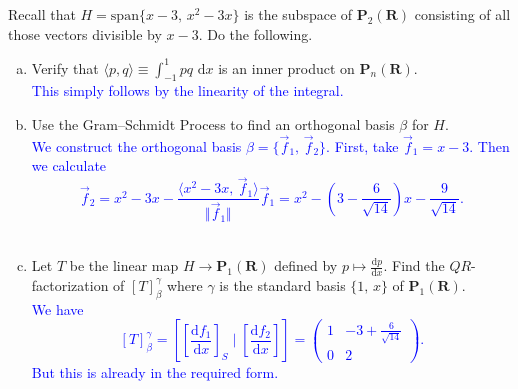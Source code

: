\documentclass[a4paper,11pt]{article}
\newcommand{\R}{\mathbf{R}}
\newcommand{\PP}{\mathbf{P}}
\newcommand{\blue}[1]{\textcolor{blue}{#1}}
\begin{document}
 Recall that
$H=\text{span}\{x-3,\,x^2-3x\}$ is the subspace of $\PP_2(\R)$
consisting of all those vectors divisible by $x-3$. Do the following.
\begin{enumerate}[(a)]
\item Verify that $\langle p,q \rangle \equiv \int_{-1}^1pq\text{ d}x$ is an
  inner product on $\PP_n(\R)$. \\

  \blue{This simply follows by the linearity of the integral. \\}

\item Use the Gram--Schmidt Process to find an orthogonal basis $\beta$ for $H$.
  \\

  \blue{We construct the orthogonal basis $\beta=\{\vec f_1,\,\vec f_2\}$.
    First, take $\vec f_1=x-3$. Then we calculate
    \[
      \vec f_2 = x^2-3x - \frac{\langle x^2-3x,\,\vec f_1 \rangle}{\Vert \vec f_1 \Vert}\vec f_1 = x^2-\left( 3-\frac{6}{\sqrt{14}} \right)x-\frac{9}{\sqrt{14}}.
    \] \\
  }

\item Let $T$ be the linear map $H \rightarrow \PP_1(\R)$ defined by $p
  \mapsto \frac{\text{d}p}{\text{d}x}$. Find the $QR$-factorization of
  $[T]_{\beta}^\gamma$ where $\gamma$ is the standard basis $\{1,\,x\}$ of
  $\PP_1(\R)$. \\

  \blue{We have
    \[
      [T]_\beta^\gamma = \left[ \left[ \frac{\text{d}f_1}{\text{d}x} \right]_S
        \mid \left[ \frac{\text{d}f_2}{\text{d}x} \right] \right] =
      \begin{pmatrix}
        1 & -3+\frac{6}{\sqrt{14}} \\
        0 & 2
      \end{pmatrix}.
    \]
    But this is already in the required form. \\}
\end{enumerate}
\end{document}

